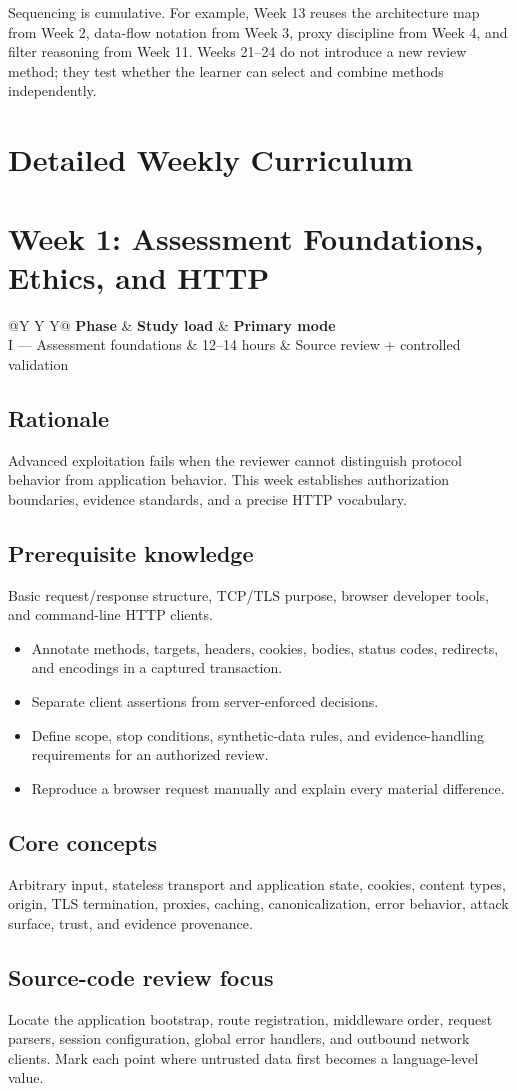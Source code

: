 \documentclass[11pt]{article}
\makeatletter
\newcommand{\weekheader}[4]{%
  \clearpage
  \section{Week #1: #2}
  \begin{tcolorbox}[colback=Navy,colframe=Navy,coltext=white]
    \begin{tabularx}{\linewidth}{@{}Y Y Y@{}}
      \textbf{Phase} & \textbf{Study load} & \textbf{Primary mode}\\
      #3 & #4 hours & Source review + controlled validation
    \end{tabularx}
  \end{tcolorbox}
}
\newcommand{\weekfield}[2]{%
  \Needspace{5\baselineskip}
  \subsection*{#1}
  #2
}
\makeatother
\begin{document}
Sequencing is cumulative. For example, Week 13 reuses the architecture map from
Week 2, data-flow notation from Week 3, proxy discipline from Week 4, and filter
reasoning from Week 11. Weeks 21--24 do not introduce a new review method; they
test whether the learner can select and combine methods independently.

\section{Detailed Weekly Curriculum}

\weekheader{1}{Assessment Foundations, Ethics, and HTTP}{I --- Assessment foundations}{12--14}

\weekfield{Rationale}{Advanced exploitation fails when the reviewer cannot
distinguish protocol behavior from application behavior. This week establishes
authorization boundaries, evidence standards, and a precise HTTP vocabulary.}

\weekfield{Prerequisite knowledge}{Basic request/response structure, TCP/TLS
purpose, browser developer tools, and command-line HTTP clients.}

\begin{objectivebox}
\begin{itemize}
  \item Annotate methods, targets, headers, cookies, bodies, status codes, redirects, and encodings in a captured transaction.
  \item Separate client assertions from server-enforced decisions.
  \item Define scope, stop conditions, synthetic-data rules, and evidence-handling requirements for an authorized review.
  \item Reproduce a browser request manually and explain every material difference.
\end{itemize}
\end{objectivebox}

\weekfield{Core concepts}{Arbitrary input, stateless transport and application
state, cookies, content types, origin, TLS termination, proxies, caching,
canonicalization, error behavior, attack surface, trust, and evidence provenance.}

\weekfield{Source-code review focus}{Locate the application bootstrap, route
registration, middleware order, request parsers, session configuration, global
error handlers, and outbound network clients. Mark each point where untrusted
data first becomes a language-level value.}
\end{document}

